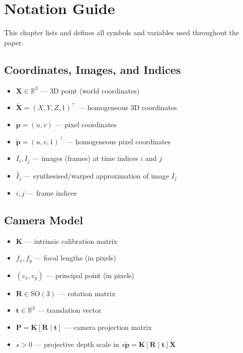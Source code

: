 
\chapter{Notation Guide}\label{chapter:notation_guide}
This chapter lists and defines all symbols and variables used throughout the paper.

\section{Coordinates, Images, and Indices}
\begin{itemize}
    \item $\mathbf{X} \in \mathbb{R}^3$ --- 3D point (world coordinates)
    \item $\tilde{\mathbf{X}} = (X, Y, Z, 1)^\top$ --- homogeneous 3D coordinates
    \item $\mathbf{p} = (u, v)$ --- pixel coordinates
    \item $\tilde{\mathbf{p}} = (u, v, 1)^\top$ --- homogeneous pixel coordinates
    \item $I_i, I_j$ --- images (frames) at time indices $i$ and $j$
    \item $\hat{I}_j$ --- synthesised/warped approximation of image $I_j$
    \item $i, j$ --- frame indices
\end{itemize}

\section{Camera Model}
\begin{itemize}
    \item $\mathbf{K}$ --- intrinsic calibration matrix
    \item $f_x, f_y$ --- focal lengths (in pixels)
    \item $(c_x, c_y)$ --- principal point (in pixels)
    \item $\mathbf{R} \in \mathrm{SO}(3)$ --- rotation matrix
    \item $\mathbf{t} \in \mathbb{R}^3$ --- translation vector
    \item $\mathbf{P} = \mathbf{K}[\mathbf{R}\mid\mathbf{t}]$ --- camera projection matrix
    \item $s > 0$ --- projective depth scale in $s\tilde{\mathbf{p}} = \mathbf{K}[\mathbf{R}\mid\mathbf{t}]\tilde{\mathbf{X}}$
\end{itemize}

